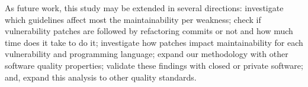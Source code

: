 \documentclass[10pt,conference]{IEEEtran}
\begin{document}
As future work, this study may be extended in several directions: 
investigate which guidelines affect most the maintainability per
weakness; check if vulnerability patches are followed by refactoring
commits or not and how much time does it take to do it; 
investigate how patches impact maintainability for each
vulnerability and programming language; expand our methodology with other
software quality properties; validate these findings with closed or private
software; and, expand this analysis to other quality standards.


%
%
\balance

{
  
  
}
\end{document}
